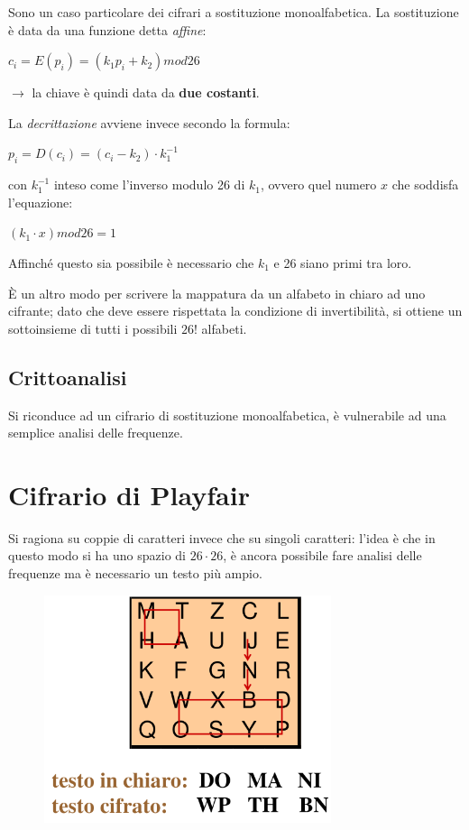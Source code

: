 Sono un caso particolare dei cifrari a sostituzione monoalfabetica. La sostituzione 
è data da una funzione detta \textit{affine}:


\begin{center}
    $c_i = E(p_i) = (k_1p_i + k_2) mod 26$
\end{center}

$\rightarrow$ la chiave è quindi data da \textbf{due costanti}.

\noindent La \textit{decrittazione} avviene invece secondo la formula:

\begin{center}
    $p_i = D(c_i) = (c_i - k_2) \cdot k_1^{-1}$
\end{center}

\noindent con $k_1^{-1}$ inteso come l'inverso modulo 26 di $k_1$, ovvero quel numero 
$x$ che soddisfa l'equazione:

\begin{center}
    $(k_1 \cdot x) mod 26 = 1$
\end{center}

\noindent Affinché questo sia possibile è necessario che $k_1$ e 26 siano primi tra loro.

\noindent È un altro modo per scrivere la mappatura da un alfabeto in chiaro ad uno 
cifrante; dato che deve essere rispettata la condizione di invertibilità, si ottiene un 
sottoinsieme di tutti i possibili $26!$ alfabeti.

\subsection{Crittoanalisi}

Si riconduce ad un cifrario di sostituzione monoalfabetica, è vulnerabile ad una semplice analisi delle frequenze.

\section{Cifrario di Playfair}

Si ragiona su coppie di caratteri invece che su singoli caratteri: l'idea è che in 
questo modo si ha uno spazio di $26 \cdot 26$, è ancora possibile fare analisi delle frequenze
ma è necessario un testo più ampio.

\begin{figure}[H]
    \centering 
    \includegraphics[width=0.6\linewidth]{chapters/chap02/images/playfair.png}
\end{figure}

